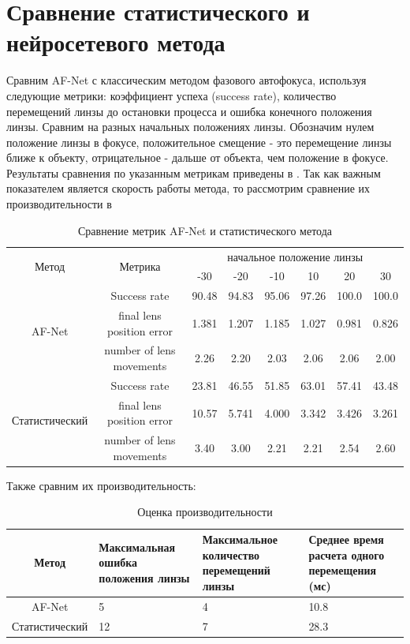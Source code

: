 \section{Сравнение статистического и нейросетевого метода}
Сравним AF-Net с классическим методом фазового автофокуса, используя следующие метрики: коэффициент успеха (success rate), количество перемещений линзы до остановки процесса и ошибка конечного положения линзы. Сравним на разных начальных положениях линзы. Обозначим нулем положение линзы в фокусе, положительное смещение - это перемещение линзы ближе к объекту, отрицательное - дальше от объекта, чем положение в фокусе. Результаты сравнения по указанным метрикам приведены в . Так как важным показателем является скорость работы метода, то рассмотрим сравнение их производительности в 

\begin{table}[!htbp]
	\centering
	\small
	\begin{tabular}{|c|c|c|c|c|c|c|c|}
		\hline
		\multirow{2}{*}{Метод}& \multirow{2}{*}{Метрика} & \multicolumn{6}{c|}{начальное положение линзы} \\
		\cline{3-8} & & -30 & -20 & -10 & 10 & 20 & 30\\ \hline
		\multirow{3}{*}{AF-Net} & Success rate & 90.48 & 94.83 & 95.06 & 97.26 & 100.0 & 100.0\\ 
		\cline{2-8} & final lens position error & 1.381 & 1.207 & 1.185 & 1.027 & 0.981 & 0.826 \\
		\cline{2-8} & number of lens movements & 2.26 & 2.20 & 2.03 & 2.06 & 2.06 & 2.00\\ \hline
		\multirow{3}{*}{Статистический} & Success rate & 23.81 & 46.55 & 51.85 & 63.01 & 57.41 & 43.48\\ 
		\cline{2-8} & final lens position error & 10.57 & 5.741 & 4.000 & 3.342 & 3.426 & 3.261 \\
		\cline{2-8} & number of lens movements & 3.40 & 3.00 & 2.21 & 2.21 & 2.54 & 2.60\\ \hline
	\end{tabular}
	\caption{Сравнение метрик AF-Net и статистического метода}
	\label{tab:Comparison}
\end{table}

Также сравним их производительность:

\begin{table}[!htbp]
	\centering
	\small
	\begin{tabular}{|c|p{4cm}<{\centering}|p{4cm}<{\centering}|p{4cm}<{\centering}|}
		\hline
		Метод & Максимальная ошибка положения линзы & Максимальное количество перемещений линзы & Среднее время расчета одного перемещения (мс)\\ \hline
		AF-Net & 5 & 4 & 10.8\\ \hline
		Статистический & 12 & 7 & 28.3 \\ \hline
	\end{tabular}
	\caption{Оценка производительности}
	\label{tab:performance}
\end{table}


